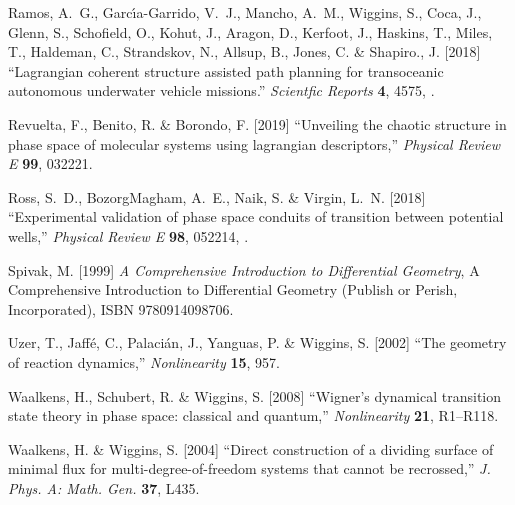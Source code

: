 \documentclass{ws-ijbc}
\begin{document}
\begin{thebibliography}{76}
	Ramos, A.~G., Garc{\'\i}a-Garrido, V.~J., Mancho, A.~M., Wiggins, S., Coca, J.,
	Glenn, S., Schofield, O., Kohut, J., Aragon, D., Kerfoot, J., Haskins, T.,
	Miles, T., Haldeman, C., Strandskov, N., Allsup, B., Jones, C. \& Shapiro.,
	J. [2018] \enquote{Lagrangian coherent structure assisted path planning for
		transoceanic autonomous underwater vehicle missions.} \emph{Scientfic
		Reports} \textbf{4},  4575, .
	
	Revuelta, F., Benito, R. \& Borondo, F. [2019] \enquote{Unveiling the chaotic
		structure in phase space of molecular systems using lagrangian descriptors,}
	\emph{Physical Review E} \textbf{99},  032221.
	
	Ross, S.~D., BozorgMagham, A.~E., Naik, S. \& Virgin, L.~N. [2018]
	\enquote{Experimental validation of phase space conduits of transition
		between potential wells,} \emph{Physical Review E} \textbf{98},  052214,
	.
	
	Spivak, M. [1999] \emph{A Comprehensive Introduction to Differential Geometry},
	A Comprehensive Introduction to Differential Geometry (Publish or Perish,
	Incorporated), ISBN 9780914098706.
	
	Uzer, T., Jaff{\'e}, C., Palaci{\'a}n, J., Yanguas, P. \& Wiggins, S. [2002]
	\enquote{The geometry of reaction dynamics,} \emph{Nonlinearity} \textbf{15},
	957.
	
	Waalkens, H., Schubert, R. \& Wiggins, S. [2008] \enquote{{Wigner's dynamical
			transition state theory in phase space: classical and quantum},}
	\emph{Nonlinearity} \textbf{21},  R1--R118.
	
	Waalkens, H. \& Wiggins, S. [2004] \enquote{{Direct construction of a dividing
			surface of minimal flux for multi-degree-of-freedom systems that cannot be
			recrossed},} \emph{J. Phys. A: Math. Gen.} \textbf{37},  L435.
	

\end{thebibliography}
\end{document}
